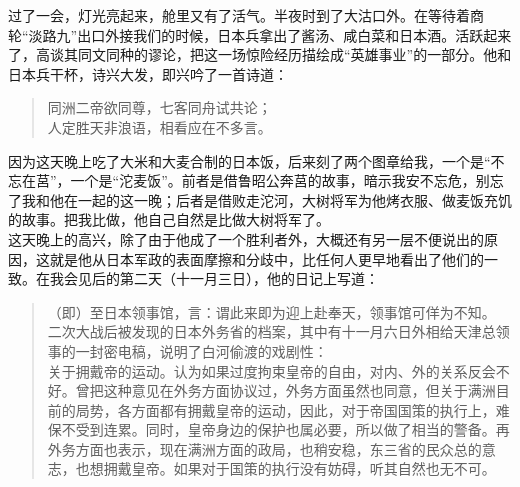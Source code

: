 过了一会，灯光亮起来，舱里又有了活气。半夜时到了大沽口外。在等待着商轮“淡路九”出口外接我们的时候，日本兵拿出了酱汤、咸白菜和日本酒。活跃起来了，高谈其同文同种的谬论，把这一场惊险经历描绘成“英雄事业”的一部分。他和日本兵干杯，诗兴大发，即兴吟了一首诗道：\\

\begin{quote}
	同洲二帝欲同尊，七客同舟试共论；\\

人定胜天非浪语，相看应在不多言。\\
\end{quote}

因为这天晚上吃了大米和大麦合制的日本饭，后来刻了两个图章给我，一个是“不忘在莒”，一个是“沱麦饭”。前者是借鲁昭公奔莒的故事，暗示我安不忘危，别忘了我和他在一起的这一晚；后者是借败走沱河，大树将军为他烤衣服、做麦饭充饥的故事。把我比做，他自己自然是比做大树将军了。\\

这天晚上的高兴，除了由于他成了一个胜利者外，大概还有另一层不便说出的原因，这就是他从日本军政的表面摩擦和分歧中，比任何人更早地看出了他们的一致。在我会见后的第二天（十一月三日），他的日记上写道：\\

\begin{quote}
	（即）至日本领事馆，言：谓此来即为迎上赴奉天，领事馆可佯为不知。\\

二次大战后被发现的日本外务省的档案，其中有十一月六日外相给天津总领事的一封密电稿，说明了白河偷渡的戏剧性：\\

关于拥戴帝的运动。认为如果过度拘束皇帝的自由，对内、外的关系反会不好。曾把这种意见在外务方面协议过，外务方面虽然也同意，但关于满洲目前的局势，各方面都有拥戴皇帝的运动，因此，对于帝国国策的执行上，难保不受到连累。同时，皇帝身边的保护也属必要，所以做了相当的警备。再外务方面也表示，现在满洲方面的政局，也稍安稳，东三省的民众总的意志，也想拥戴皇帝。如果对于国策的执行没有妨碍，听其自然也无不可。\\
\end{quote}
